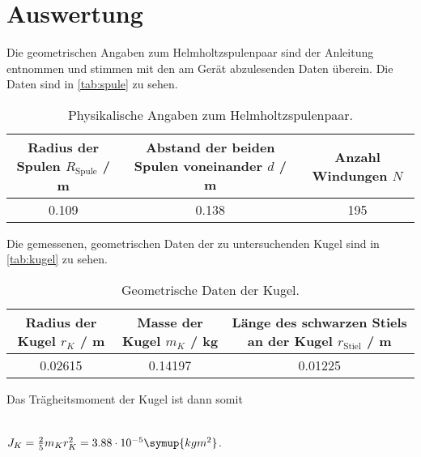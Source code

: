 \section{Auswertung}
\label{sec:Auswertung}


  Die geometrischen Angaben zum Helmholtzspulenpaar sind der Anleitung \cite[2]{V105} entnommen und stimmen mit den am Gerät  
  abzulesenden Daten überein. Die Daten sind in \autoref{tab:spule} zu sehen.
  \begin{table}[!htp]
    \centering
    \caption{Physikalische Angaben zum Helmholtzspulenpaar.}
    \label{tab:spule}
    \begin{tabular}{c c c}
    \toprule
    {Radius der Spulen $R_\text{Spule}$ / m} & {Abstand der beiden Spulen voneinander $d$ / m} & {Anzahl Windungen $N$} \\
    \midrule
    0.109 & 0.138 & 195 \\
    \bottomrule
    \end{tabular}
  \end{table}

  Die gemessenen, geometrischen Daten der zu untersuchenden Kugel sind in \autoref{tab:kugel} zu sehen.
  \begin{table}[!htp]
    \centering
    \caption{Geometrische Daten der Kugel.}
    \label{tab:kugel}
    \begin{tabular}{c c c}
    \toprule
    {Radius der Kugel $r_K$ / m} & {Masse der Kugel $m_K$ / kg} & {Länge des schwarzen Stiels an der Kugel  $r_\text{Stiel}$ / m}\\
    \midrule
    0.02615 & 0.14197 & 0.01225 \\
    \bottomrule
    \end{tabular}
  \end{table}
  
  Das Trägheitsmoment der Kugel ist dann somit 
  \\ \\
  \centerline{$J_K = \frac{2}{5} m_K r_K^{2} = 3.88 \cdot 10^{-5} \symup{kg m^2}$.}
  \\ \\

